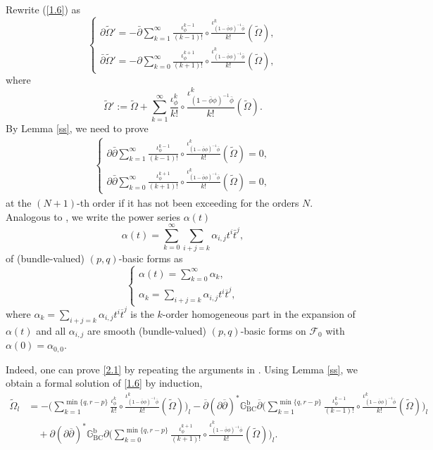 \documentclass[12pt]{amsart}
\numberwithin{equation}{section}
\theoremstyle{definition}
\theoremstyle{definition}
\theoremstyle{definition}
\renewcommand{\1}{\mathsf{1}}
\newcommand{\G}{\mathbb{G}}
\newcommand{\db}{\overline{\partial}}
\renewcommand{\>}{\rightarrow}
\newcommand{\p}{\partial}
\def\p{\partial}
\def\b{\bar}
\def\mc{\mathcal}
\theoremstyle{plain} %
\theoremstyle{plain} %
\theoremstyle{plain} %
\begin{document}
	Rewrite (\ref{1.6}) as
	$$
	\begin{cases}
		\p\widetilde{\Omega}'=-\b{\p}\sum_{k=1}^{\infty}\frac{ {\iota}^{k-1}_{ \phi}}{(k-1)!}\circ\frac{ {\iota}^{k}_{(\1-\b{ \phi} \phi)^{-1}\b{ \phi}}}{k!}(\widetilde{\Omega}),\\
		\b{\p}\widetilde{\Omega}'=-\p \sum_{k=0}^{\infty} \frac{ {\iota}^{k+1}_{ \phi}}{(k+1)!}\circ\frac{ {\iota}^{k}_{(\1-\b{ \phi} \phi)^{-1}\b{ \phi}}}{k!}(\widetilde{\Omega}),
	\end{cases}
	$$
	where
	$$\widetilde{\Omega}':=\widetilde{\Omega}+\sum_{k=1}^{\infty}\frac{ {\iota}^{k}_{ \phi}}{k!}\circ\frac{ {\iota}^{k}_{(\1-\b{ \phi} \phi)^{-1}\b{ \phi}}}{k!}(\widetilde{\Omega}).$$
	By Lemma \ref{ss}, we need to prove
	\begin{align}\label{2.1}
		\begin{cases}
			\p\b{\p}\sum_{k=1}^{\infty}\frac{ {\iota}^{k-1}_{ \phi}}{(k-1)!}\circ\frac{ {\iota}^{k}_{(\1-\b{ \phi} \phi)^{-1}\b{ \phi}}}{k!}(\widetilde{\Omega})
			=0,\\
			\p\b{\p}\sum_{k=0}^{\infty} \frac{ {\iota}^{k+1}_{ \phi}}{(k+1)!}\circ\frac{ {\iota}^{k}_{(\1-\b{ \phi} \phi)^{-1}\b{ \phi}}}{k!}(\widetilde{\Omega})=0,
		\end{cases}
	\end{align}
	at the $(N+1)$-th order  if it has not been exceeding for the orders $N$.  Analogous to \cite[p. 471]{RWZ19}, we write the power series $\alpha(t)$
	$$\alpha(t)=\sum_{k=0}^{\infty}\sum_{i+j=k}\alpha_{i,j}t^i\b{t}^j,$$
	of (bundle-valued)  $(p,q)$-basic forms as
	\[ \begin{cases}
		\alpha(t) = \sum^{\infty}_{k=0} \alpha_k, \\[4pt]
		\alpha_k = \sum_{i+j=k} \alpha_{i,j}t^i \overline{t}^j,
	\end{cases} \]
	where $\alpha_k= \sum_{i+j=k} \alpha_{i,j}t^i \overline{t}^j$ is the $k$-order homogeneous part in the expansion
	of $\alpha(t)$ and all $\alpha_{i,j}$ are smooth (bundle-valued)
	$(p,q)$-basic forms on $\mc F_0$ with $\alpha(0)=\alpha_{0,0}$.
	
Indeed, one can prove \eqref{2.1} by repeating the arguments in \cite[p. 476]{RWZ19}. Using Lemma \ref{ss}, we obtain a formal solution of \eqref{1.6} by induction,
	\begin{equation}\label{express-tO}
		\begin{aligned}
			\widetilde{\Omega}_l
			&=-\Big(\sum_{k=1}^{\min\{q,r-p\}}\frac{ {\iota}^{k}_{ \phi}}{k!}\circ\frac{ {\iota}^{k}_{(\1-\b{ \phi} \phi)^{-1}\b{ \phi}}}{k!}(\widetilde{\Omega})\Big)_l
			-\db(\p\db)^*\G^\mathrm b_{\mathrm {BC}}\db\Big(\sum_{k=1}^{\min\{q,r-p\}}\frac{ {\iota}^{k-1}_{ \phi}}{(k-1)!}\circ\frac{ {\iota}^{k}_{(\1-\b{ \phi} \phi)^{-1}\b{ \phi}}}{k!}(\widetilde{\Omega})\Big)_l\\
			&\quad +\p(\p\db)^*\G^\mathrm b_{\mathrm {BC}}\p\Big(\sum_{k=0}^{\min\{q,r-p\}} \frac{ {\iota}^{k+1}_{ \phi}}{(k+1)!}\circ\frac{ {\iota}^{k}_{(\1-\b{ \phi} \phi)^{-1}\b{ \phi}}}{k!}(\widetilde{\Omega})\Big)_l.
		\end{aligned}
	\end{equation}
	
\end{document}
